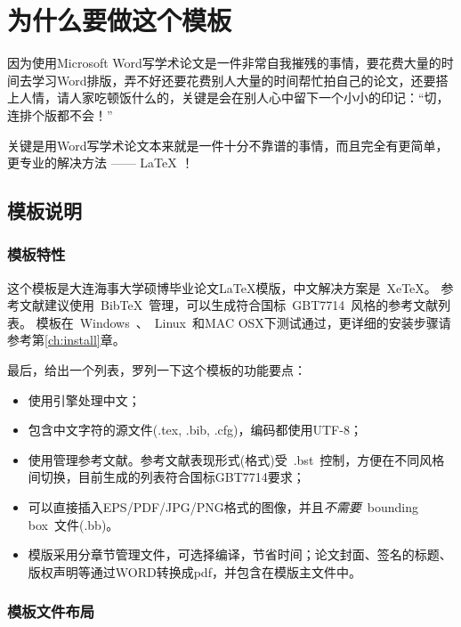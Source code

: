 \chapter{为什么要做这个模板}\label{ch:intr}

因为使用Microsoft Word写学术论文是一件非常自我摧残的事情，要花费大量的时间去学习Word排版，弄不好还要花费别人大量的时间帮忙拍自己的论文，还要搭上人情，请人家吃顿饭什么的，关键是会在别人心中留下一个小小的印记：“切，连排个版都不会！”

{\xiaoerhao 关键是用Word写学术论文本来就是一件十分{\color{red}不}靠谱的事情，而且完全有更简单，更专业的解决方法 —— {\color{blue}\LaTeX} ！}


\section{模板说明}
\label{sec:fastguide}

\subsection{模板特性}
\label{sec:features}

这个模板是大连海事大学硕博毕业论文\LaTeX{}模版，中文解决方案是~Xe\TeX{}。
参考文献建议使用~BibTeX~管理，可以生成符合国标~GBT7714~风格的参考文献列表。
模板在~Windows~、~Linux~和MAC OSX下测试通过，更详细的安装步骤请参考第\ref{ch:install}章。


最后，给出一个列表，罗列一下这个模板的功能要点：

\begin{itemize}
\item 使用\XeTeX 引擎处理中文；
\item 包含中文字符的源文件(.tex, .bib, .cfg)，编码都使用UTF-8；
\item 使用\BibTeX 管理参考文献。参考文献表现形式(格式)受~.bst~控制，方便在不同风格间切换\cite{Schmidt,Schneider2010,Sha2003,Shan2010,Wang2010}，目前生成的列表符合国标GBT7714要求；
\item 可以直接插入EPS/PDF/JPG/PNG格式的图像，并且\emph{不需要}~bounding box~文件(.bb)。
\item 模版采用分章节管理文件，可选择编译，节省时间；论文封面、签名的标题、版权声明等通过WORD转换成pdf，并包含在模版主文件中。

\end{itemize}

\subsection{模板文件布局}
\label{sec:layout}

